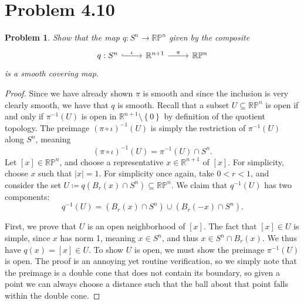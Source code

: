 \documentclass[11pt, letterpaper]{article}
\theoremstyle{plain}
\newtheorem{problem}{Problem}[section]
\begin{document}
\section{Problem 4.10}
\begin{problem}\label{3}
	Show that the map $q : S^n \to \mathbb{R} \mathbb{P} ^n$ given by the composite
	\[\begin{tikzcd}[row sep = 2.5em, column sep = 2.5em]
		q: S^n\ar[" \iota  ", hook, r]  & \mathbb{R} ^{n+1} \ar[" \pi  ", r]  & \mathbb{R} \mathbb{P} ^n
	\end{tikzcd}\]
	is a smooth covering map.
\end{problem}
\begin{proof}
	Since we have already shown $\pi $ is smooth and since the inclusion is very clearly smooth, we have that $q$ is smooth. Recall that a subset $U \subseteq \mathbb{R} \mathbb{P} ^n$ is open if and only if $\pi ^{-1} (U)$ is open in $\mathbb{R} ^{n+1} \setminus \left\{ 0 \right\} $ by definition of the quotient topology. The preimage $(\pi \circ \iota )^{-1} (U)$ is simply the restriction of $\pi^{-1} (U)$ along $S^n$, meaning
	\[
		(\pi \circ \iota )^{-1} (U)=\pi ^{-1} (U)\cap S^n
	.\]
	Let $[x]\in \mathbb{R} \mathbb{P}^n$, and choose a representative $x\in\mathbb{R} ^{n+1} $ of $[x]$. For simplicity, choose $x$ such that $\left| x \right| =1$. For simplicity once again, take $0<r<1$, and consider the set $U\coloneqq q(B_r(x)\cap S^n)\subseteq \mathbb{R} \mathbb{P} ^n$. We claim that $q^{-1} (U)$ has two components:
	\[
		q^{-1} (U)=(B_r(x) \cap S^n) \cup (B_r(-x) \cap S^n)
	.\]

	First, we prove that $U$ is an open neighborhood of $[x]$. The fact that $[x]\in U$ is simple, since $x$ has norm 1, meaning $x\in S^n$, and thus $x\in S^n \cap B_r(x)$. We thus have $q(x)=[x]\in U$. To show $U$ is open, we must show the preimage $\pi ^{-1}(U)$ is open. The proof is an annoying yet routine verification, so we simply note that the preimage is a double cone that does not contain its boundary, so given a point we can always choose a distance such that the ball about that point falls within the double cone.


\end{proof}
\end{document}
